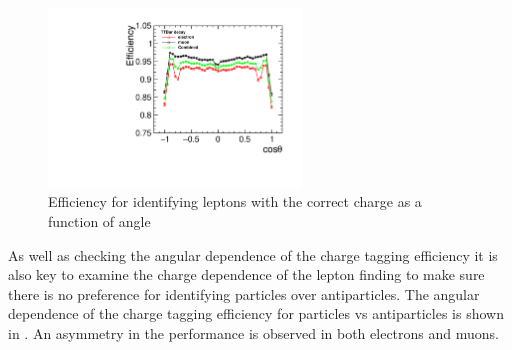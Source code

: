 \begin{figure}
  \centering
  \includegraphics[width=0.6\textwidth]{TopAnalysis/figures/NetEfficiencys}
  \caption[Charge Tagging Efficiency]{Efficiency for identifying leptons with the correct charge as a function of angle}
  \label{fig:netefficiency}
\end{figure}

As well as checking the angular dependence of the charge tagging efficiency it is also key to examine the charge dependence of the lepton finding to make sure there is no preference for identifying particles over antiparticles. The angular dependence of the charge tagging efficiency for particles vs antiparticles is shown in . An asymmetry in the performance is observed in both electrons and muons.

